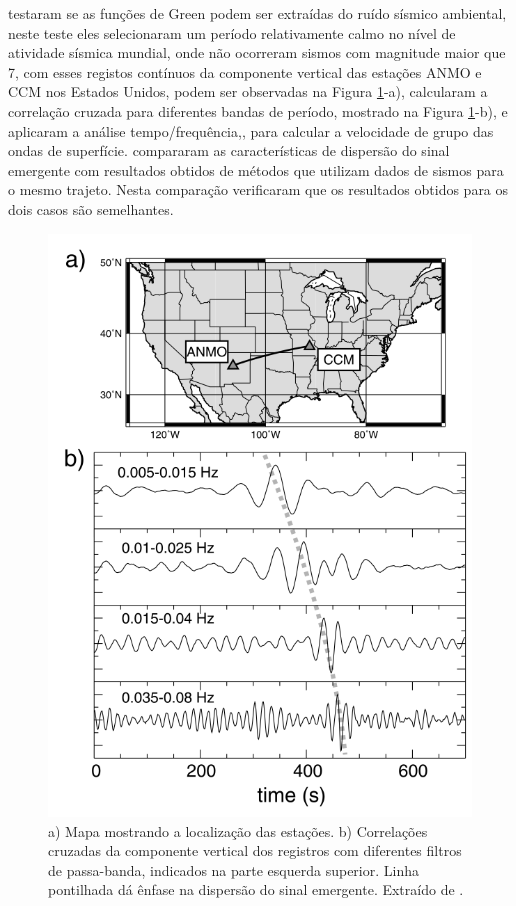 \cite{shapiro_emergence_2004} testaram se as funções de Green podem ser extraídas do ruído sísmico ambiental, neste teste eles selecionaram um
período relativamente calmo no nível de atividade sísmica mundial, onde não ocorreram sismos com magnitude maior que 7, com esses registos contínuos da componente vertical das estações ANMO e CCM nos Estados Unidos, podem ser observadas na Figura \ref{shapiro}-a), calcularam a correlação cruzada para diferentes bandas de período, mostrado na Figura \ref{shapiro}-b), e aplicaram a análise tempo/frequência,\cite{levshin_automated_2001}, para calcular a velocidade de grupo das ondas de superfície. \cite{shapiro_emergence_2004} compararam as características de dispersão do sinal emergente com resultados obtidos de métodos que utilizam dados de sismos para o mesmo trajeto.  Nesta comparação verificaram que os resultados obtidos para os dois casos são semelhantes.

\begin{figure}[!ht]
\centering
\includegraphics[scale=0.5]{Figs/shapiro2004.png}
\caption{a) Mapa mostrando a localização das estações. b) Correlações cruzadas da componente vertical dos registros com diferentes filtros de passa-banda, indicados na parte esquerda superior. Linha pontilhada dá ênfase na dispersão do sinal emergente. Extraído de \cite{shapiro_emergence_2004}.}
\label{shapiro}
\end{figure} 

